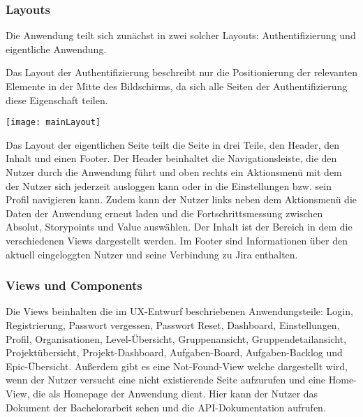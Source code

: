 \subsubsection{Layouts}
Die Anwendung teilt sich zunächst in zwei solcher Layouts: Authentifizierung und eigentliche Anwendung.

Das Layout der Authentifizierung beschreibt nur die Positionierung der relevanten Elemente in der Mitte des Bildschirms, da sich alle Seiten der Authentifizierung diese Eigenschaft teilen.

\vspace{20pt}
\begin{center}
    \begin{minipage}{0.8\linewidth}
        \texttt{[image: mainLayout]}
    \end{minipage}
\end{center}
\vspace{20pt}

Das Layout der eigentlichen Seite teilt die Seite in drei Teile, den Header, den Inhalt und einen Footer. Der Header beinhaltet die Navigationsleiste, die den Nutzer durch die Anwendung führt und oben rechts ein Aktionsmenü mit dem der Nutzer sich jederzeit ausloggen kann oder in die Einstellungen bzw. sein Profil navigieren kann. Zudem kann der Nutzer links neben dem Aktionsmenü die Daten der Anwendung erneut laden und die Fortschrittsmessung zwischen Absolut, Storypoints und Value auswählen. Der Inhalt ist der Bereich in dem die verschiedenen Views dargestellt werden. Im Footer sind Informationen über den aktuell eingeloggten Nutzer und seine Verbindung zu Jira enthalten.

\subsubsection{Views und Components}
Die Views beinhalten die im UX-Entwurf beschriebenen Anwendungsteile: Login, Registrierung, Passwort vergessen, Passwort Reset, Dashboard, Einstellungen, Profil, Organisationen, Level-Übersicht, Gruppenansicht, Gruppendetailansicht, Projektübersicht, Projekt-Dashboard, Aufgaben-Board, Aufgaben-Backlog und Epic-Übersicht. Außerdem gibt es eine Not-Found-View welche dargestellt wird, wenn der Nutzer versucht eine nicht existierende Seite aufzurufen und eine Home-View, die als Homepage der Anwendung dient. Hier kann der Nutzer das Dokument der Bachelorarbeit sehen und die API-Dokumentation aufrufen.


